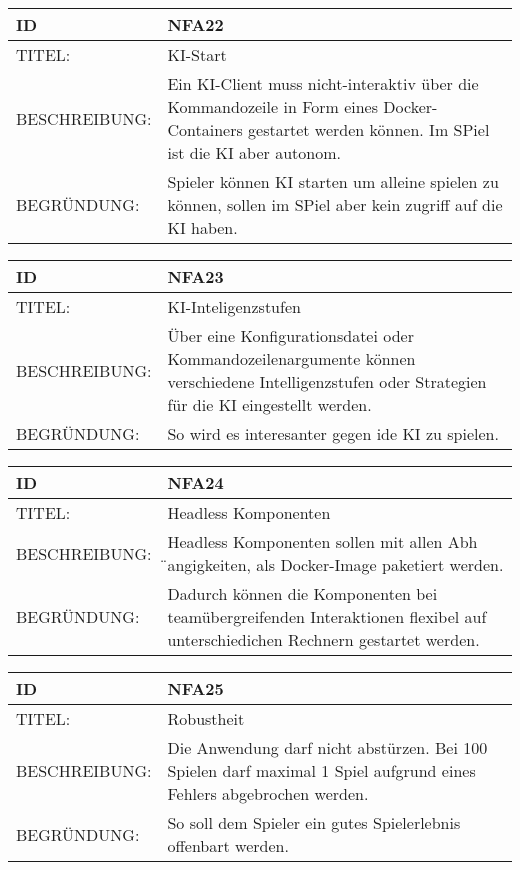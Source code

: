 \documentclass{uulm-assignment}
\begin{document}
    \begin{tabularx}{\textwidth}{|l|X |} \hline
        \textbf{ID} & \textbf{NFA22} \\
        \hline
        TITEL: &  KI-Start\\
        \hline
        BESCHREIBUNG: &  Ein KI-Client muss nicht-interaktiv über die Kommandozeile in Form eines Docker-Containers gestartet werden können. Im SPiel ist die KI aber autonom.\\
        \hline
        BEGRÜNDUNG: &  Spieler können KI starten um alleine spielen zu können, sollen im SPiel aber kein zugriff auf die KI haben.\\
        \hline
    \end{tabularx}
    
    \begin{tabularx}{\textwidth}{|l|X |} \hline
        \textbf{ID} & \textbf{NFA23} \\
        \hline
        TITEL: &  KI-Inteligenzstufen\\
        \hline
        BESCHREIBUNG: &  Über eine Konfigurationsdatei oder Kommandozeilenargumente können verschiedene
Intelligenzstufen oder Strategien für die KI eingestellt werden.\\
        \hline
        BEGRÜNDUNG: &  So wird es interesanter gegen ide KI zu spielen.\\
        \hline
    \end{tabularx}

    \begin{tabularx}{\textwidth}{|l|X |} \hline
        \textbf{ID} & \textbf{NFA24} \\
        \hline
        TITEL: & Headless Komponenten\\
        \hline
        BESCHREIBUNG: & Headless Komponenten sollen mit allen Abh ̈angigkeiten, als Docker-Image paketiert werden.\\
        \hline
        BEGRÜNDUNG: & Dadurch können die Komponenten bei teamübergreifenden Interaktionen flexibel auf unterschiedichen Rechnern gestartet werden.\\
        \hline
    \end{tabularx}
    
    
    \begin{tabularx}{\textwidth}{|l|X |} \hline
        \textbf{ID} & \textbf{NFA25} \\
        \hline
        TITEL: & Robustheit \\
        \hline
        BESCHREIBUNG: & Die Anwendung darf nicht abstürzen. Bei 100 Spielen darf maximal 1 Spiel
        aufgrund eines Fehlers abgebrochen werden. \\
        \hline
        BEGRÜNDUNG: & So soll dem Spieler ein gutes Spielerlebnis offenbart werden. \\
        \hline
    \end{tabularx}
\end{document}
